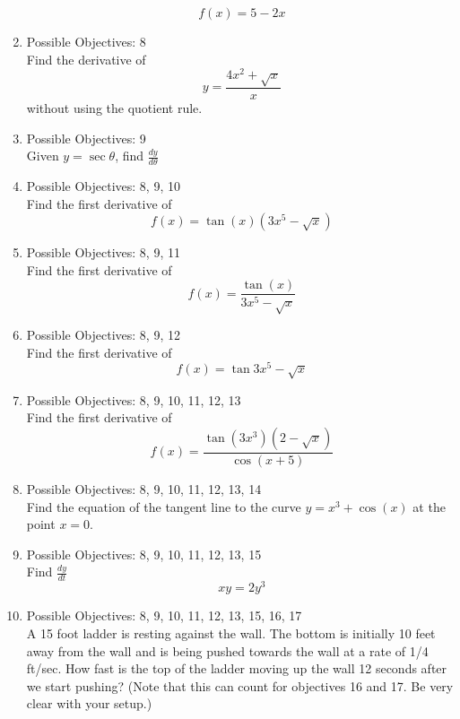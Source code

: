 \documentclass{exam}
\begin{document}
\begin{enumerate}
$$f(x) = 5 - 2x$$
\item Possible Objectives: 8\\
Find the derivative of $$y = \frac{4x^2 + \sqrt{x}}{x}$$ without using the quotient rule.
\item Possible Objectives: 9\\
Given $y = \sec{\theta}$, find $\frac{dy}{d\theta}$
\item Possible Objectives: 8, 9, 10\\
Find the first derivative of $$f(x) = \tan(x)(3x^5 - \sqrt{x})$$
\item Possible Objectives: 8, 9, 11\\
Find the first derivative of $$f(x) = \frac{\tan(x)}{3x^5 - \sqrt{x}}$$
\item Possible Objectives: 8, 9, 12\\ 
Find the first derivative of $$f(x) = \tan{3x^5 - \sqrt{x}}$$
\item Possible Objectives: 8, 9, 10, 11, 12, 13\\
Find the first derivative of $$f(x) = \frac{\tan(3x^3)(2- \sqrt{x})}{\cos(x + 5)}$$
\item Possible Objectives: 8, 9, 10, 11, 12, 13, 14\\
Find the equation of the tangent line to the curve $y = x^3 + \cos(x)$ at the point $x = 0$.
\item Possible Objectives: 8, 9, 10, 11, 12, 13, 15\\
Find $\frac{dy}{dt}$
$$xy = 2y^3$$
\item Possible Objectives: 8, 9, 10, 11, 12, 13, 15, 16, 17\\
A 15 foot ladder is resting against the wall. The bottom is initially 10 feet away from the wall and is being pushed towards the wall at a rate of 1/4 ft/sec. How fast is the top of the ladder moving up the wall 12 seconds after we start pushing? (Note that this can count for objectives 16 and 17. Be very clear with your setup.)
\end{enumerate}
\end{document}
